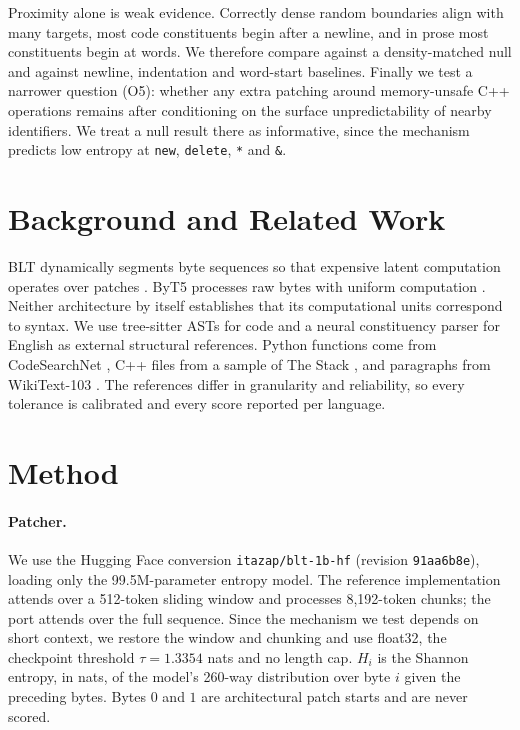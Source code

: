 Proximity alone is weak evidence. Correctly dense random boundaries align with many targets, most code constituents begin after a newline, and in prose most constituents begin at words. We therefore compare against a density-matched null and against newline, indentation and word-start baselines. Finally we test a narrower question (O5): whether any extra patching around memory-unsafe C++ operations remains after conditioning on the surface unpredictability of nearby identifiers. We treat a null result there as informative, since the mechanism predicts low entropy at \texttt{new}, \texttt{delete}, \texttt{*} and \texttt{\&}.

\section{Background and Related Work}
BLT dynamically segments byte sequences so that expensive latent computation operates over patches \citep{pagnoni-etal-2025-byte}. ByT5 processes raw bytes with uniform computation \citep{xue-etal-2022-byt5}. Neither architecture by itself establishes that its computational units correspond to syntax. We use tree-sitter ASTs for code and a neural constituency parser for English \citep{kitaev-klein-2018-constituency} as external structural references. Python functions come from CodeSearchNet \citep{husain2019codesearchnet}, C++ files from a sample of The Stack \citep{kocetkov2022stack}, and paragraphs from WikiText-103 \citep{merity2017pointer}. The references differ in granularity and reliability, so every tolerance is calibrated and every score reported per language.

\section{Method}
\paragraph{Patcher.} We use the Hugging Face conversion \texttt{itazap/blt-1b-hf} (revision \texttt{91aa6b8e}), loading only the 99.5M-parameter entropy model. The reference implementation attends over a 512-token sliding window and processes 8{,}192-token chunks; the port attends over the full sequence. Since the mechanism we test depends on short context, we restore the window and chunking and use float32, the checkpoint threshold $\tau=1.3354$ nats and no length cap. $H_i$ is the Shannon entropy, in nats, of the model's 260-way distribution over byte $i$ given the preceding bytes. Bytes $0$ and $1$ are architectural patch starts and are never scored.

